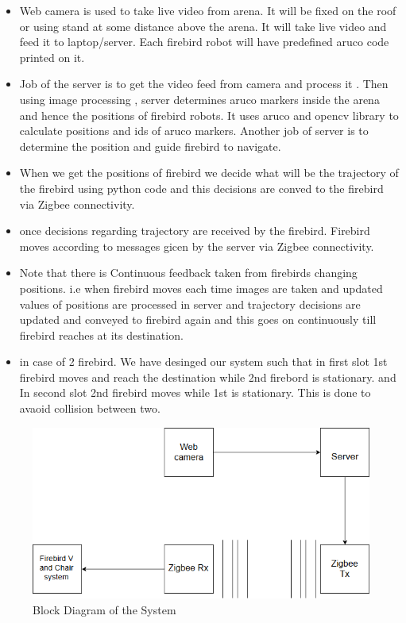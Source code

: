 \documentclass[]{exam}
\begin{document}
\begin{itemize}
\item Web camera is used to take live video from arena. It will be fixed on the roof or using stand at some distance above the arena. It will take live video and feed it to laptop/server. Each firebird robot will have predefined aruco code printed on it.
\item Job of the server is to get the video feed from camera and process it . Then using image processing , server determines aruco markers inside the arena and hence the positions of firebird robots. It uses aruco and opencv library to calculate positions and ids  of aruco markers. Another job of server is to determine the position and guide firebird to navigate. 
\item When we get the positions of firebird we decide what will be the trajectory of the firebird using python code and this decisions are conved to the firebird via Zigbee connectivity. 
\item once decisions regarding trajectory are received by the firebird. Firebird moves according to messages gicen by the server via Zigbee connectivity. 
\item Note that there is Continuous feedback taken from firebirds changing positions. i.e when firebird moves each time images are taken and updated values of positions are processed in server and trajectory decisions are updated and conveyed to firebird again and this goes on continuously till firebird reaches at its destination. 
\item in case of 2 firebird. We have desinged our system such that in first slot 1st firebird moves and reach the destination while 2nd firebord is stationary. and In second slot 2nd firebird moves while 1st is stationary. This is done to avaoid collision between two. 
\end{itemize} 

\begin{figure}[h!]


 \centering
 
  \includegraphics[scale=0.65]{block_diagram.png}
  \caption{Block Diagram of the System }
  \label{block_diagram}
  \end{figure}
  
\end{document}
